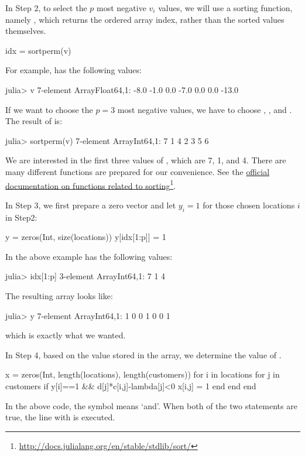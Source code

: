 In Step 2, to select the $p$ most negative $v_i$ values, we will use a sorting function, namely , which returns the ordered array index, rather than the sorted values themselves.
\begin{code}
idx = sortperm(v)
\end{code}
\noindent For example,  has the following values:
\begin{code}
julia> v
7-element Array{Float64,1}:
  -8.0
  -1.0
   0.0
  -7.0
   0.0
   0.0
 -13.0
\end{code}
\noindent If we want to choose the $p=3$ most negative values, we have to choose , , and . The result of  is:
\begin{code}
julia> sortperm(v)
7-element Array{Int64,1}:
 7
 1
 4
 2
 3
 5
 6
\end{code}
\noindent We are interested in the first three values of , which are 7, 1, and 4. There are many different functions are prepared for our convenience. See the \href{http://docs.julialang.org/en/stable/stdlib/sort/}{official documentation on functions related to sorting}\footnote{\url{http://docs.julialang.org/en/stable/stdlib/sort/}}.

In Step 3, we first prepare a zero vector and let $y_i=1$ for those chosen locations $i$ in Step2:
\begin{code}
y = zeros(Int, size(locations))
y[idx[1:p]] = 1
\end{code}
\noindent In the above example  has the following values:
\begin{code}
julia> idx[1:p]
3-element Array{Int64,1}:
 7
 1
 4
\end{code}
\noindent The resulting  array looks like:
\begin{code}
julia> y
7-element Array{Int64,1}:
 1
 0
 0
 1
 0
 0
 1
\end{code}
\noindent which is exactly what we wanted.

In Step 4, based on the value stored in the  array, we determine the value of .
\begin{code}
x = zeros(Int, length(locations), length(customers))
for i in locations
    for j in customers
        if y[i]==1 && d[j]*c[i,j]-lambda[j]<0
            x[i,j] = 1
        end
    end
end
\end{code}
\noindent In the above code, the symbol \kode{\&\&} means `and'. When both of the two statements are true, the line with  is executed.

